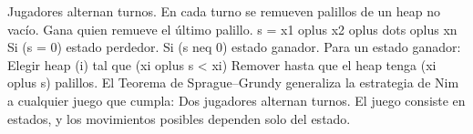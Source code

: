 \markdownRendererUlItem Jugadores alternan turnos.\markdownRendererUlItemEnd 
\markdownRendererUlItem En cada turno se remueven palillos de un heap no vacío.\markdownRendererUlItemEnd 
\markdownRendererUlItem Gana quien remueve el último palillo.\markdownRendererUlItemEnd 
\markdownRendererUlEndTight \markdownRendererInterblockSeparator
{}\markdownRendererSectionBegin
{}\markdownRendererInterblockSeparator
{}\markdownRendererDollarSign{}\markdownRendererDollarSign{}\markdownRendererSoftLineBreak
{}s = x\markdownRendererUnderscore{}1 \markdownRendererBackslash{}oplus x\markdownRendererUnderscore{}2 \markdownRendererBackslash{}oplus \markdownRendererBackslash{}dots \markdownRendererBackslash{}oplus x\markdownRendererUnderscore{}n\markdownRendererSoftLineBreak
{}\markdownRendererDollarSign{}\markdownRendererDollarSign{}\markdownRendererInterblockSeparator
{}\markdownRendererUlBeginTight
\markdownRendererUlItem Si \markdownRendererDollarSign{}(s = 0)\markdownRendererDollarSign{} estado perdedor.\markdownRendererUlItemEnd 
\markdownRendererUlItem Si \markdownRendererDollarSign{}(s \markdownRendererBackslash{}neq 0)\markdownRendererDollarSign{} estado ganador.\markdownRendererUlItemEnd 
\markdownRendererUlEndTight \markdownRendererInterblockSeparator
{}
\markdownRendererSectionEnd \markdownRendererSectionBegin
{}\markdownRendererInterblockSeparator
{}Para un estado ganador:\markdownRendererInterblockSeparator
{}\markdownRendererUlBeginTight
\markdownRendererUlItem Elegir heap \markdownRendererDollarSign{}(i)\markdownRendererDollarSign{} tal que \markdownRendererDollarSign{}(x\markdownRendererUnderscore{}i \markdownRendererBackslash{}oplus s < x\markdownRendererUnderscore{}i)\markdownRendererDollarSign{}\markdownRendererUlItemEnd 
\markdownRendererUlItem Remover hasta que el heap tenga \markdownRendererDollarSign{}(x\markdownRendererUnderscore{}i \markdownRendererBackslash{}oplus s)\markdownRendererDollarSign{} palillos.\markdownRendererUlItemEnd 
\markdownRendererUlEndTight \markdownRendererParagraphSeparator
{}
\markdownRendererSectionEnd \markdownRendererSectionBegin
{}\markdownRendererInterblockSeparator
{}El Teorema de Sprague–Grundy generaliza la estrategia de Nim a cualquier juego que cumpla:\markdownRendererInterblockSeparator
{}\markdownRendererUlBeginTight
\markdownRendererUlItem Dos jugadores alternan turnos.\markdownRendererUlItemEnd 
\markdownRendererUlItem El juego consiste en estados, y los movimientos posibles dependen solo del estado.\markdownRendererUlItemEnd 
